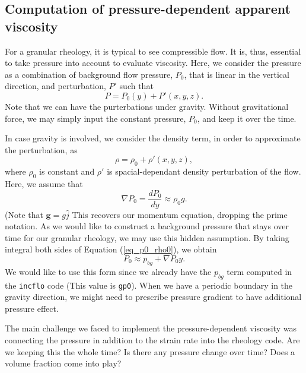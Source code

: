\subsection{Computation of pressure-dependent apparent viscosity}
For a granular rheology, it is typical to see compressible flow. It is, thus, essential to take pressure into account to evaluate viscosity.
Here, we consider the pressure as a combination of background flow pressure, $P_0$, that is linear in the vertical direction, and perturbation, $P'$ such that
\[
P = P_0(y) + P'(x,y,z).\]
Note that we can have the purterbations under gravity. Without gravitational force, we may simply input the constant pressure, $P_0$, and keep it over the time.
\par
In case gravity is involved, we consider the density term, in order to approximate the perturbation, as 
\[
\rho  = \rho_0  + \rho'(x,y,z), 
\]
where $\rho_0$ is constant and $\rho'$ is spacial-dependant density perturbation of the flow. 
Here, we assume that 
\begin{equation}
    \nabla P_0  = \frac{d P_0}{d y} \approx \rho_0  g.  
\label{eq_p0_rho0}
\end{equation}
(Note that ${\bm g} = g \hat{j}$
This recovers our momentum equation, dropping the prime notation. As we would like to construct a background pressure that stays over time for our granular rheology, we may use this hidden assumption.
By taking integral both sides of Equation (\ref{eq_p0_rho0}), we obtain
\begin{equation}
    P_0 \approx p_{bg} + \nabla P_0 y.
\end{equation}
We would like to use this form since we already have the $p_{bg}$ term computed in the \verb+incflo+ code (This value is \verb+gp0+).
When we have a periodic boundary in the gravity direction, we might need to prescribe pressure gradient to have additional pressure effect. 
\par
The main challenge we faced to implement the pressure-dependent viscosity was connecting the pressure in addition to the strain rate into the rheology code.
{\color{blue} Are we keeping this the whole time? Is there any pressure change over time? Does a volume fraction come into play?}

